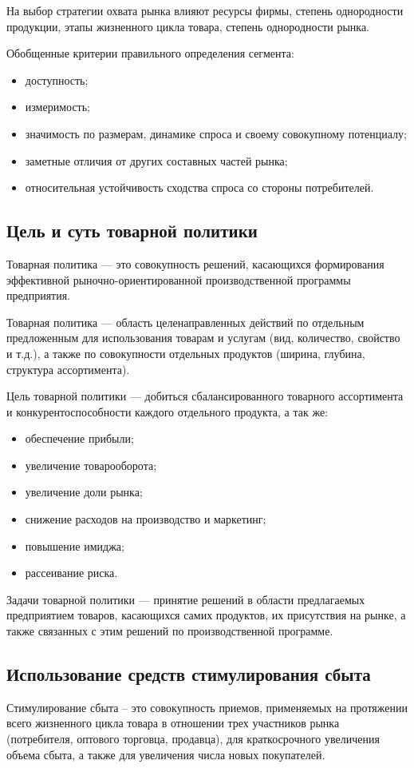 \documentclass[a4paper,12pt,oneside,final]{extarticle}
\numberwithin{equation}{section}
\begin{document}
\begin{enumerate}
На выбор стратегии охвата рынка влияют ресурсы фирмы, степень однородности продукции, этапы жизненного цикла товара, степень однородности рынка.

Обобщенные критерии правильного определения сегмента:
\begin{itemize}
\item доступность;
\item измеримость;
\item значимость по размерам, динамике спроса и своему совокупному потенциалу;
\item заметные отличия от других составных частей рынка;
\item относительная устойчивость сходства спроса со стороны потребителей.
\end{itemize}

\subsection{Цель и суть товарной политики}
Товарная политика --- это совокупность решений, касающихся формирования эффективной рыночно-ориентированной производственной программы предприятия.

Товарная политика ­­--- область целенаправленных действий по отдельным предложенным для использования товарам и услугам (вид, количество, свойство и т.д.), а также по совокупности отдельных продуктов (ширина, глубина, структура ассортимента).

Цель товарной политики --- добиться сбалансированного товарного ассортимента и конкурентоспособности каждого отдельного продукта, а так же:
\begin{itemize}
	\item обеспечение прибыли;
	\item увеличение товарооборота;
	\item увеличение доли рынка;
	\item снижение расходов на производство и маркетинг;
	\item повышение имиджа;
	\item рассеивание риска.
\end{itemize}

Задачи товарной политики --- принятие решений в области предлагаемых предприятием товаров, касающихся самих продуктов, их присутствия на рынке, а также связанных с этим решений по производственной программе.

\subsection{Использование средств стимулирования сбыта}
Стимулирование сбыта – это совокупность приемов, применяемых на протяжении всего жизненного цикла товара в отношении трех участников рынка (потребителя, оптового торговца, продавца), для краткосрочного увеличения объема сбыта, а также для увеличения числа новых покупателей.


\end{enumerate}
\end{document}
